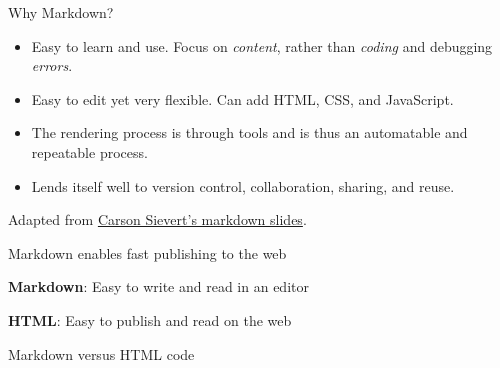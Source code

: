 \documentclass[ignorenonframetext,]{beamer}
\providecommand{\tightlist}{%
  \setlength{\itemsep}{0pt}\setlength{\parskip}{0pt}}
\begin{document}
\begin{frame}{%
\protect\hypertarget{why-markdown}{%
Why Markdown?}}

\begin{itemize}
\tightlist
\item
  Easy to learn and use. Focus on \emph{content}, rather than
  \emph{coding} and debugging \emph{errors}.
\item
  Easy to edit yet very flexible. Can add HTML, CSS, and JavaScript.
\item
  The rendering process is through tools and is thus an automatable and
  repeatable process.
\item
  Lends itself well to version control, collaboration, sharing, and
  reuse.
\end{itemize}

Adapted from
\href{http://cpsievert.github.io/slides/markdown/\#/1}{Carson Sievert’s
markdown slides}.

\end{frame}

\begin{frame}{%
\protect\hypertarget{markdown-enables-fast-publishing-to-the-web}{%
Markdown enables fast publishing to the web}}

\textbf{Markdown}: Easy to write and read in an editor

\textbf{HTML}: Easy to publish and read on the web

\end{frame}

\begin{frame}{%
\protect\hypertarget{markdown-versus-html-code}{%
Markdown versus HTML code}}

\end{frame}
\end{document}
